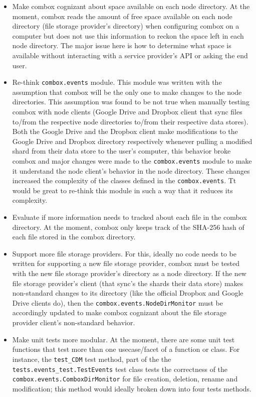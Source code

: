 \begin{itemize}
\item Make combox cognizant about space available on each node
  directory. At the moment, combox reads the amount of free space
  available on each node directory (file storage provider's directory)
  when configuring combox on a computer but does not use this
  information to reckon the space left in each node directory. The major issue here is how to determine what space is available without interacting with a service provider's API or asking the end user.


\item Re-think \verb+combox.events+ module. This module was written
  with the assumption that combox will be the only one to make changes
  to the node directories. This assumption was found to be not true
  when manually testing combox with node clients (Google Drive and
  Dropbox client that sync files to/from the respective node
  directories to/from their respective data stores). Both the Google
  Drive and the Dropbox client make modifications to the Google Drive
  and Dropbox directory respectively whenever pulling a modified shard
  from their data store to the user's computer, this behavior broke
  combox and major changes were made to the \verb+combox.events+
  module to make it understand the node client's behavior in the node
  directory. These changes increased the complexity of the classes
  defined in the \verb+combox.events+. Tt would be great to re-think
  this module in such a way that it reduces its complexity.

\item Evaluate if more information needs to tracked about each file in
  the combox directory. At the moment, combox only keeps track of the
  SHA-256 hash of each file stored in the combox directory.

\item Support more file storage providers. For this, ideally no code
  needs to be written for supporting a new file storage provider,
  combox must be tested with the new file storage provider's directory
  as a node directory. If the new file storage provider's client (that
  sync's the shards their data store) makes non-standard changes to its
  directory (like the official Dropbox and Google Drive clients do),
  then the \verb+combox.events.NodeDirMonitor+ must be accordingly
  updated to make combox cognizant about the file storage provider
  client's non-standard behavior.

\item Make unit tests more modular. At the moment, there are some unit
  test functions that test more than one usecase/facet of a function
  or class. For instance, the \verb+test_CDM+ test method, part of the
  the \verb+tests.events_test.TestEvents+ test class tests the
  correctness of the \verb+combox.events.ComboxDirMonitor+ for file
  creation, deletion, rename and modification; this method would
  ideally broken down into four tests methods.


\end{itemize}
